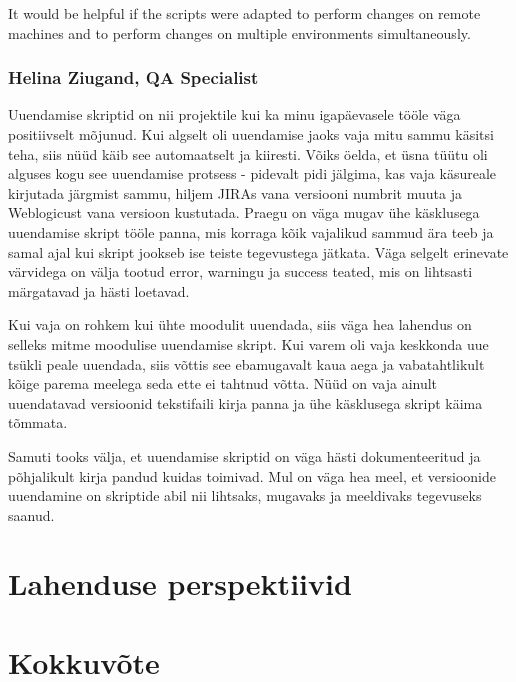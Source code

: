 \documentclass[12pt]{report}
\begin{document}
It would be helpful if the scripts were adapted to perform changes on remote machines and to perform changes on multiple environments simultaneously.

  \subsubsection{Helina Ziugand, QA Specialist}
  
  Uuendamise skriptid on nii projektile kui ka minu igapäevasele tööle väga positiivselt mõjunud. 
Kui algselt oli uuendamise jaoks vaja mitu sammu käsitsi teha, siis nüüd käib see automaatselt ja kiiresti. Võiks öelda, et üsna tüütu oli alguses kogu see uuendamise protsess - pidevalt pidi jälgima, kas vaja käsureale kirjutada järgmist sammu, hiljem JIRAs vana versiooni numbrit muuta ja Weblogicust vana versioon kustutada. Praegu on väga mugav ühe käsklusega uuendamise skript tööle panna, mis korraga kõik vajalikud sammud ära teeb ja samal ajal kui skript jookseb ise teiste tegevustega jätkata. Väga selgelt erinevate värvidega on välja tootud error, warningu ja success teated, mis on lihtsasti märgatavad ja hästi loetavad. 

Kui vaja on rohkem kui ühte moodulit uuendada, siis väga hea lahendus on selleks mitme moodulise uuendamise skript. Kui varem oli vaja keskkonda uue tsükli peale uuendada, siis võttis see ebamugavalt kaua aega ja vabatahtlikult kõige parema meelega seda ette ei tahtnud võtta. Nüüd on vaja ainult uuendatavad versioonid tekstifaili kirja panna ja ühe käsklusega skript käima tõmmata. 

Samuti tooks välja, et uuendamise skriptid on väga hästi dokumenteeritud ja põhjalikult kirja pandud kuidas toimivad. Mul on väga hea meel, et versioonide uuendamine on skriptide abil nii lihtsaks, mugavaks ja meeldivaks tegevuseks saanud.

  \newpage
  
  \section{Lahenduse perspektiivid}
  
  \newpage
  
  \section*{Kokkuvõte}
  \label{kokkuvote}
\end{document}
